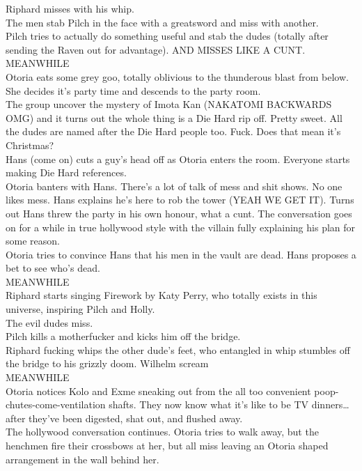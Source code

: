 Riphard misses with his whip.\\
The men stab Pilch in the face with a greatsword and miss with another.\\
Pilch tries to actually do something useful and stab the dudes (totally after sending the Raven out for advantage). AND MISSES LIKE A CUNT.\\
MEANWHILE\\
Otoria eats some grey goo, totally oblivious to the thunderous blast from below. She decides it’s party time and descends to the party room.\\
The group uncover the mystery of Imota Kan (NAKATOMI BACKWARDS OMG) and it turns out the whole thing is a Die Hard rip off. Pretty sweet. All the dudes are named after the Die Hard people too. Fuck. Does that mean it’s Christmas?\\
Hans (come on) cuts a guy's head off as Otoria enters the room. Everyone starts making Die Hard references.\\
Otoria banters with Hans. There’s a lot of talk of mess and shit shows. No one likes mess. Hans explains he’s here to rob the tower (YEAH WE GET IT). Turns out Hans threw the party in his own honour, what a cunt. The conversation goes on for a while in true hollywood style with the villain fully explaining his plan for some reason.\\
Otoria tries to convince Hans that his men in the vault are dead. Hans proposes a bet to see who’s dead.\\
MEANWHILE\\
Riphard starts singing Firework by Katy Perry, who totally exists in this universe, inspiring Pilch and Holly.\\
The evil dudes miss.\\
Pilch kills a motherfucker and kicks him off the bridge.\\
Riphard fucking whips the other dude’s feet, who entangled in whip stumbles off the bridge to his grizzly doom. Wilhelm scream\\
MEANWHILE\\
Otoria notices Kolo and Exme sneaking out from the all too convenient poop-chutes-come-ventilation shafts. They now know what it’s like to be TV dinners… after they’ve been digested, shat out, and flushed away.\\
The hollywood conversation continues. Otoria tries to walk away, but the henchmen fire their crossbows at her, but all miss leaving an Otoria shaped arrangement in the wall behind her.\\
